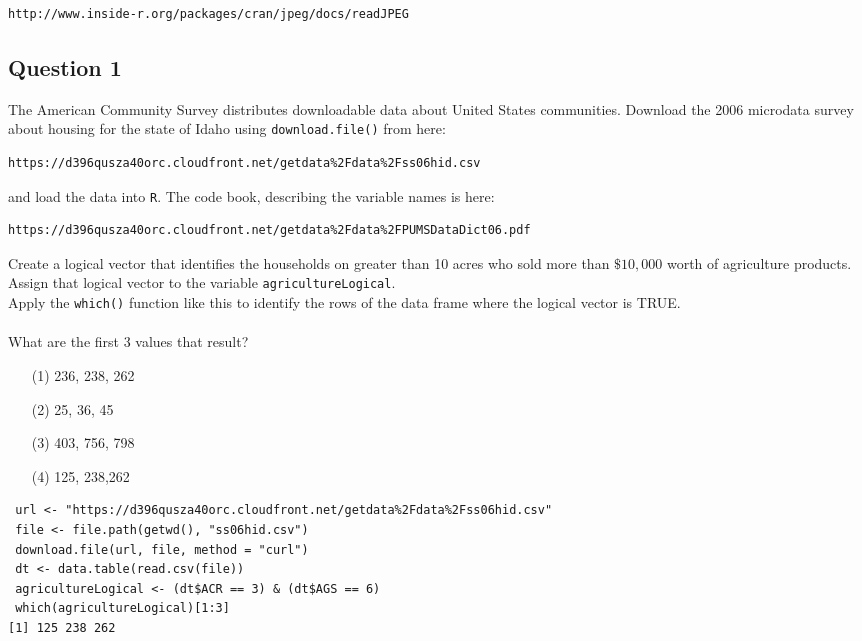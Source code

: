 \documentclass[]{article}
\begin{document}
\begin{verbatim}
http://www.inside-r.org/packages/cran/jpeg/docs/readJPEG
\end{verbatim}
\subsection*{Question 1}
The American Community Survey distributes downloadable data about United States communities. Download the 2006 microdata survey about housing for the state of Idaho using \texttt{download.file()} from here: 
\begin{verbatim}
https://d396qusza40orc.cloudfront.net/getdata%2Fdata%2Fss06hid.csv 
\end{verbatim}
and load the data into \texttt{R}. The code book, describing the variable names is here: 
\begin{verbatim}
https://d396qusza40orc.cloudfront.net/getdata%2Fdata%2FPUMSDataDict06.pdf 
\end{verbatim}

\noindent Create a logical vector that identifies the households on greater than 10 acres who sold more than $\$10,000$ worth of agriculture products. 
\\
Assign that logical vector to the variable \texttt{agricultureLogical}. \\ 
Apply the \texttt{which()} function like this to identify the rows of the data frame where the logical vector is TRUE. \\
\\
What are the first 3 values that result?
\begin{itemize}
\item[(1)] 236, 238, 262
\item[(2)] 25, 36, 45
\item[(3)] 403, 756, 798
\item[(4)] 125, 238,262
\end{itemize}
\begin{framed}
\begin{verbatim}
 url <- "https://d396qusza40orc.cloudfront.net/getdata%2Fdata%2Fss06hid.csv"
 file <- file.path(getwd(), "ss06hid.csv")
 download.file(url, file, method = "curl")
 dt <- data.table(read.csv(file))
 agricultureLogical <- (dt$ACR == 3) & (dt$AGS == 6)
 which(agricultureLogical)[1:3]
[1] 125 238 262
\end{verbatim}
\end{framed}
\newpage
\end{document}
